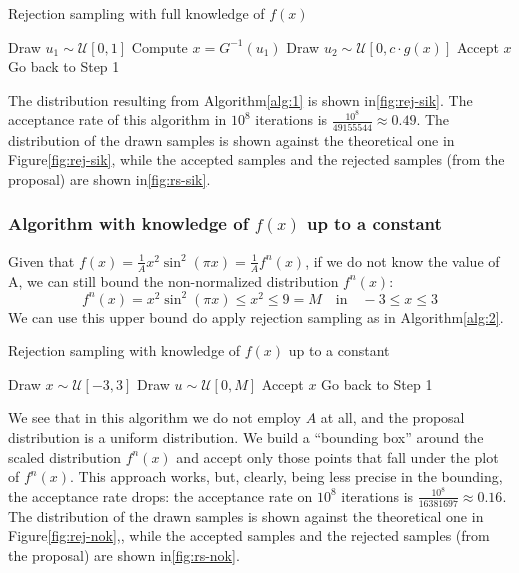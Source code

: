 \documentclass[a4paper,12pt]{article}
\begin{document}
\begin{algorithm}
  \caption{Rejection sampling with full knowledge of $f(x)$}
  \label{alg:1}
  \begin{algorithmic}[1]
    \STATE Draw $u_1 \sim \mathcal{U}[0,1]$
    \STATE Compute $x = G^{-1}(u_1)$
    \STATE Draw $u_2 \sim \mathcal{U}[0, c \cdot g(x)]$
    \STATE Accept $x$
    \ELSE
    \STATE Go back to Step 1
    \ENDIF
  \end{algorithmic}
\end{algorithm}

The distribution resulting from Algorithm\ref{alg:1} is shown in\ref{fig:rej-sik}. The acceptance rate of this algorithm in $10^8$ iterations is $\frac{10^8}{49155544} \approx 0.49$. The distribution of the drawn samples is shown against the theoretical one in Figure\ref{fig:rej-sik}, while the accepted samples and the rejected samples (from the proposal) are shown in\ref{fig:rs-sik}.

\subsubsection*{Algorithm with knowledge of $f(x)$ up to a constant}
Given that $f(x) = \frac{1}{A}x^2\sin^2(\pi x)=\frac{1}{A}f^n(x)$, if we do not know the value of A, we can still bound the non-normalized distribution $f^{n}(x)$:
\begin{equation}
  f^n(x) = x^2\sin^2(\pi x) \leq x^2 \leq 9 = M\quad \text{in}\quad -3\leq x\leq3
\end{equation}
We can use this upper bound do apply rejection sampling as in Algorithm\ref{alg:2}.

\begin{algorithm}
  \caption{Rejection sampling with knowledge of $f(x)$ up to a constant}
  \label{alg:2}
  \begin{algorithmic}[1]
    \STATE Draw $x \sim \mathcal{U}[-3,3]$
    \STATE Draw $u \sim \mathcal{U}[0, M]$
    \STATE Accept $x$
    \ELSE
    \STATE Go back to Step 1
    \ENDIF
  \end{algorithmic}
\end{algorithm}

We see that in this algorithm we do not employ $A$ at all, and the proposal distribution is a uniform distribution. We build a ``bounding box'' around the scaled distribution $f^n(x)$ and accept only those points that fall under the plot of $f^n(x)$. This approach works, but, clearly, being less precise in the bounding, the acceptance rate drops: the acceptance rate on $10^8$ iterations is $\frac{10^8}{16381697} \approx 0.16$. The distribution of the drawn samples is shown against the theoretical one in Figure\ref{fig:rej-nok},, while the accepted samples and the rejected samples (from the proposal) are shown in\ref{fig:rs-nok}.
\end{document}
